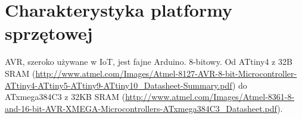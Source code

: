 \chapter{Charakterystyka platformy sprzętowej}
\label{cha:hardware}

AVR, szeroko używane w IoT, jest fajne Arduino. 8-bitowy. Od ATtiny4 z 32B SRAM (\url{http://www.atmel.com/Images/Atmel-8127-AVR-8-bit-Microcontroller-ATtiny4-ATtiny5-ATtiny9-ATtiny10_Datasheet-Summary.pdf}) do ATxmega384C3 z 32KB SRAM (\url{http://www.atmel.com/Images/Atmel-8361-8-and-16-bit-AVR-XMEGA-Microcontrollers-ATxmega384C3_Datasheet.pdf}). 

